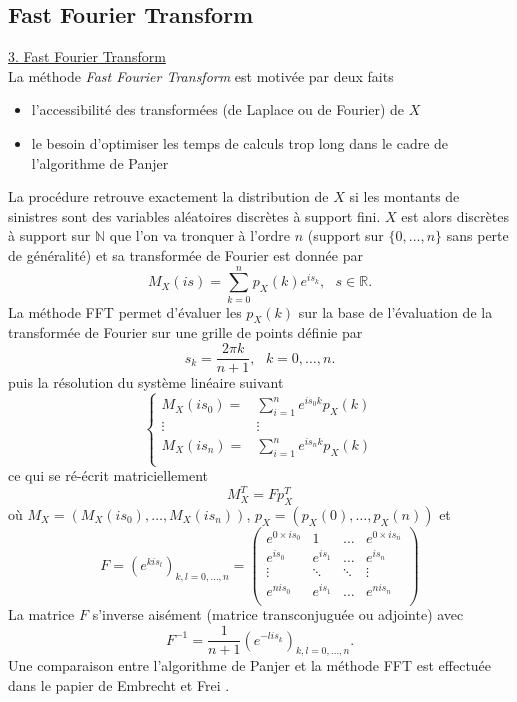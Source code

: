 \documentclass[8pt,notheorems]{beamer}
\def \N{\mathbb N}
\newcommand{\R}{\mathbb{R}}
\theoremstyle{definition}
\theoremstyle{example}
\theoremstyle{mystyle}
\theoremstyle{plain}
\begin{document}
\subsection{Fast Fourier Transform}
\begin{frame}[allowframebreaks]
\underline{3. Fast Fourier Transform}\\
La méthode \textit{Fast Fourier Transform} est motivée par deux faits
\begin{itemize}
    \item l'accessibilité des transformées (de Laplace ou de Fourier) de $X$
    \item le besoin d'optimiser les temps de calculs trop long dans le cadre de l'algorithme de Panjer
\end{itemize}
La procédure retrouve exactement la distribution de $X$ si les montants de sinistres sont des variables aléatoires discrètes à support fini. $X$ est alors discrètes à support sur $\N$ que l'on va tronquer à l'ordre $n$ (support sur $\{0,\ldots, n\}$ sans perte de généralité) et sa transformée de Fourier est donnée par
$$
M_X(is) = \sum_{k = 0}^n p_X(k)e^{is_k},\text{ }s\in \R.
$$
La méthode FFT permet d'évaluer les $p_X(k)$ sur la base de l'évaluation de la transformée de Fourier sur une grille de points définie par
$$
s_k = \frac{2\pi k}{n+1},\text{ }k = 0, \ldots, n.
$$
puis la résolution du système linéaire suivant
$$
\begin{cases}
M_X(i s_0)=&\sum_{i = 1}^{n}e^{i s_0 k}p_X(k)\\
\vdots&\vdots\\
M_X(i s_{n})=&\sum_{i = 1}^{n}e^{i s_{n} k}p_X(k)\\
\end{cases}
$$
ce qui se ré-écrit matriciellement
$$
M_X^T = F p_X^T
$$
où $M_X = (M_X(i s_0),\ldots, M_X(i s_n))$, $p_X=(p_X(0),\ldots, p_X(n))$ et
$$
F =\left(e^{kis_l}\right)_{k,l=0,\ldots, n}=
\left(
\begin{array}{cccc}
e^{0\times is_0}&1&\ldots&e^{0\times is_n}\\
e^{is_0}&e^{is_1}&\ldots&e^{ is_n}\\
\vdots&\ddots&\ddots&\vdots\\
e^{nis_0}&e^{is_1}&\ldots&e^{ nis_n}\\
\end{array}
\right)
$$
La matrice $F$ s'inverse aisément (matrice transconjuguée ou adjointe) avec
$$
F^{-1} = \frac{1}{n+1}\left(e^{- lis_k}\right)_{k,l=0,\ldots, n}.
$$
Une comparaison entre l'algorithme de Panjer et la méthode FFT est effectuée dans le papier de Embrecht et Frei \cite{embrechts2009panjer}.
\end{frame}
\end{document}
